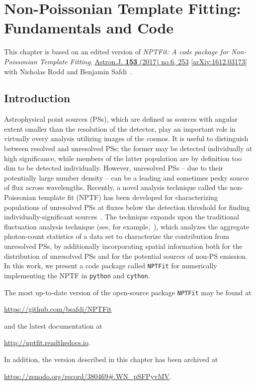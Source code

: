 \chapter{Non-Poissonian Template Fitting: Fundamentals and Code}
\label{ch:nptfit}

This chapter is based on an edited version of \emph{NPTFit: A code package for Non-Poissonian Template Fitting},  \href{http://iopscience.iop.org/article/10.3847/1538-3881/aa6d5f/meta}{Astron.J. \textbf{153} (2017) no.6, 253}  \href{https://arxiv.org/abs/1612.03173}{ [arXiv:1612.03173]} with Nicholas Rodd and Benjamin Safdi~\cite{Mishra-Sharma:2016gis}.

\section{Introduction}

Astrophysical point sources (PSs), which are defined as sources with angular extent smaller than the resolution of the detector, play an important role in virtually every analysis utilizing images of the cosmos.  It is useful to distinguish between resolved and unresolved PSs; the former may be detected individually at high significance, while members of the latter population are by definition too dim to be detected individually.  However, unresolved PSs -- due to their potentially large number density -- can be a leading and sometimes pesky source of flux across wavelengths.
  Recently, a novel analysis technique called the non-Poissonian template fit (NPTF) has been developed for characterizing populations of unresolved PSs at fluxes below the detection threshold for finding individually-significant sources~\cite{Lee:2014mza,Lee:2015fea}.  The technique expands upon the traditional fluctuation analysis technique (see, for example,~\cite{Miyaji:2001dp,Malyshev:2011zi}), which analyzes the aggregate photon-count statistics of a data set to characterize the contribution from unresolved PSs, by additionally incorporating spatial information both for the distribution of unresolved PSs and for the potential sources of non-PS emission.  In this work, we present a code package called \texttt{NPTFit} for numerically implementing the NPTF in \texttt{python} and \texttt{cython}.
  
The most up-to-date version of the open-source package \texttt{NPTFit} may be found at
\begin{center}
\url{https://github.com/bsafdi/NPTFit}
\end{center}
and the latest documentation at
\begin{center}
\url{http://nptfit.readthedocs.io}.
\end{center}
In addition, the version described in this chapter has been archived at
\begin{center}
\url{https://zenodo.org/record/380469#.WN_pSFPyvMV}.
\end{center}

